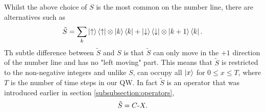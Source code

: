 Whilst the above choice of $S$ is the most common on the number line, there are alternatives such as
\begin{equation}
    \tilde{S} = \sum_k \ket{\uparrow}\bra{\uparrow} \otimes \ket{k}\bra{k} + \ket{\downarrow}\bra{\downarrow} \otimes \ket{k + 1}\bra{k}.
\end{equation}
Th subtle difference between $\tilde{S}$ and $S$ is that $\tilde{S}$ can only move in the $+1$ direction of the number line and has no "left moving" part.
This means that $\tilde{S}$ is restricted to the non-negative integers and unlike $S$, can occupy all $\ket{x}$ for $0\leq x\leq T$, where $T$ is the number of time steps in our QW.
In fact $\tilde{S}$ is an operator that was introduced earlier in section \ref{subsubsection:operators},
\begin{equation}
    \tilde{S} = C\text{-}X.
\end{equation}
\FloatBarrier